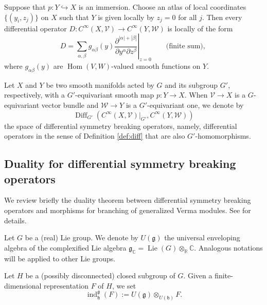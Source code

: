 \begin{example}
[{\cite[Ex.~2.4 (2)]{KP1}}]
\label{ex:diffXY}
Suppose that $p \colon Y \hookrightarrow X$
 is an immersion.  
\newline
Choose an atlas
 of local coordinates
 $\{(y_i,z_j)\}$ on $X$
 such that $Y$ is given locally
 by $z_j=0$
 for all $j$.  
Then every differential operator
 $D \colon C^{\infty} (X, {\mathcal{V}}) \to C^{\infty} (Y, {\mathcal{W}})$
 is locally
 of the form
\[
   D=\sum_{\alpha,\beta} g_{\alpha \beta} (y)
     \left. 
     \frac{\partial^{|\alpha|+|\beta|}}{\partial y ^{\alpha}\partial z^{\beta}}
     \right|_{z=0}
\qquad
\text{(finite sum), }
\]
where $g_{\alpha \beta} (y)$ are ${\operatorname{Hom}}(V,W)$-valued smooth functions on $Y$.  
\end{example}

Let $X$ and $Y$ be two smooth manifolds
 acted by $G$ and its subgroup $G'$, 
respectively,
 with a $G'$-equivariant smooth map 
 $p \colon Y \to X$.  
When ${\mathcal{V}} \to X$ is a $G$-equivariant vector bundle
 and ${\mathcal{W}} \to Y$ is a $G'$-equivariant one,
 we denote by 
\[
   {\operatorname{Diff}}_{G'}
   (C^{\infty}(X,{\mathcal{V}})|_{G'}, C^{\infty}(Y,{\mathcal{W}}))   
\]
 the space of differential symmetry breaking operators, 
 namely,
 differential operators
 in the sense of Definition \ref{def:diff}
 that are also $G'$-homomorphisms.  

\subsection{Duality for differential symmetry breaking operators}
\label{subsec:dualVerma}

We review briefly the duality theorem
 between differential symmetry breaking operators
 and morphisms for branching of generalized Verma modules.  
See \cite[Sect.~2]{KP1} for details.  

Let $G$ be a (real) Lie group.  
We denote by 
$U({\mathfrak{g}})$
 the universal enveloping algebra of the complexified Lie algebra
 ${\mathfrak{g}}_{\mathbb{C}}={\operatorname{Lie}}(G) \otimes_{{\mathbb{R}}}
 {\mathbb{C}}$.  
Analogous notations will be applied to other Lie groups.  


Let $H$ be a (possibly disconnected) closed subgroup of $G$.  
Given a finite-dimensional representation $F$ of $H$, 
we set 
\begin{equation}
\label{eqn:VermaH}
{\operatorname{ind}}_{\mathfrak{h}}^{\mathfrak{g}}(F)
:=U({\mathfrak{g}}) \otimes_{U({\mathfrak{h}})}F.  
\end{equation}



